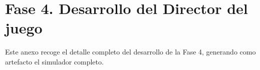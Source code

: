 \documentclass[../main.tex]{subfiles}
\begin{document}
	\chapter{Fase 4. Desarrollo del Director del juego}
	\label{sec:DerarrolloFase4}
	
	Este anexo recoge el detalle completo del desarrollo de la Fase 4, generando como artefacto el simulador completo.
	
	
	
	
	
	\clearpage
	
\end{document}
